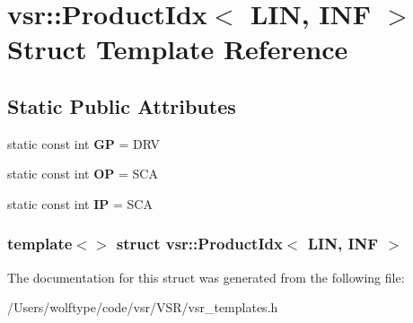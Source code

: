 \hypertarget{structvsr_1_1_product_idx_3_01_l_i_n_00_01_i_n_f_01_4}{\section{vsr\-:\-:Product\-Idx$<$ L\-I\-N, I\-N\-F $>$ Struct Template Reference}
\label{structvsr_1_1_product_idx_3_01_l_i_n_00_01_i_n_f_01_4}
}
\subsection*{Static Public Attributes}
\begin{DoxyCompactItemize}
\item 
\hypertarget{structvsr_1_1_product_idx_3_01_l_i_n_00_01_i_n_f_01_4_a50aa9ebd9ec94e95f97e418bc7f82e2c}{static const int {\bfseries G\-P} = D\-R\-V}\label{structvsr_1_1_product_idx_3_01_l_i_n_00_01_i_n_f_01_4_a50aa9ebd9ec94e95f97e418bc7f82e2c}

\item 
\hypertarget{structvsr_1_1_product_idx_3_01_l_i_n_00_01_i_n_f_01_4_add246fcbc812513300ff59c0802754d5}{static const int {\bfseries O\-P} = S\-C\-A}\label{structvsr_1_1_product_idx_3_01_l_i_n_00_01_i_n_f_01_4_add246fcbc812513300ff59c0802754d5}

\item 
\hypertarget{structvsr_1_1_product_idx_3_01_l_i_n_00_01_i_n_f_01_4_a90be6ee3fb9c81e11549083e44b247b0}{static const int {\bfseries I\-P} = S\-C\-A}\label{structvsr_1_1_product_idx_3_01_l_i_n_00_01_i_n_f_01_4_a90be6ee3fb9c81e11549083e44b247b0}

\end{DoxyCompactItemize}
\subsubsection*{template$<$$>$ struct vsr\-::\-Product\-Idx$<$ L\-I\-N, I\-N\-F $>$}



The documentation for this struct was generated from the following file\-:\begin{DoxyCompactItemize}
\item 
/\-Users/wolftype/code/vsr/\-V\-S\-R/vsr\-\_\-templates.\-h\end{DoxyCompactItemize}
